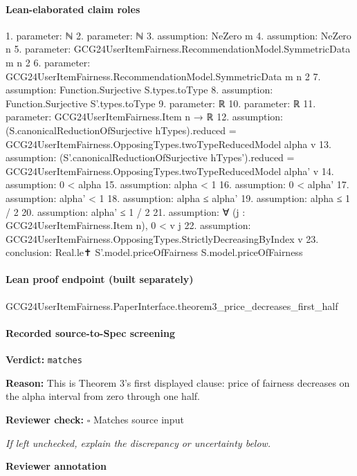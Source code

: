 \documentclass[10pt]{article}
\newcommand{\reviewerbox}{%
  \par\noindent\fbox{\parbox{0.96\linewidth}{\rule{0pt}{0.38in}}}\par
}
\newcommand{\reviewmatch}[1]{%
  \par\noindent\textbf{Reviewer check:} $\square$\; #1\par
  \noindent\emph{If left unchecked, explain the discrepancy or uncertainty below.}\par
}
\begin{document}
\paragraph{Lean-elaborated claim roles}\begin{ReviewVerbatim}
1. parameter: ℕ
2. parameter: ℕ
3. assumption: NeZero m
4. assumption: NeZero n
5. parameter: GCG24UserItemFairness.RecommendationModel.SymmetricData m n 2
6. parameter: GCG24UserItemFairness.RecommendationModel.SymmetricData m n 2
7. assumption: Function.Surjective S.types.toType
8. assumption: Function.Surjective S'.types.toType
9. parameter: ℝ
10. parameter: ℝ
11. parameter: GCG24UserItemFairness.Item n → ℝ
12. assumption: (S.canonicalReductionOfSurjective hTypes).reduced = GCG24UserItemFairness.OpposingTypes.twoTypeReducedModel alpha v
13. assumption: (S'.canonicalReductionOfSurjective hTypes').reduced = GCG24UserItemFairness.OpposingTypes.twoTypeReducedModel alpha' v
14. assumption: 0 < alpha
15. assumption: alpha < 1
16. assumption: 0 < alpha'
17. assumption: alpha' < 1
18. assumption: alpha ≤ alpha'
19. assumption: alpha ≤ 1 / 2
20. assumption: alpha' ≤ 1 / 2
21. assumption: ∀ (j : GCG24UserItemFairness.Item n), 0 < v j
22. assumption: GCG24UserItemFairness.OpposingTypes.StrictlyDecreasingByIndex v
23. conclusion: Real.le✝ S'.model.priceOfFairness S.model.priceOfFairness
\end{ReviewVerbatim}

\paragraph{Lean proof endpoint (built separately)}\begin{ReviewVerbatim}
GCG24UserItemFairness.PaperInterface.theorem3_price_decreases_first_half
\end{ReviewVerbatim}

\paragraph{Recorded source-to-Spec screening}
\textbf{Verdict:} \texttt{matches}
\\
{\raggedright
\textbf{Reason:} This is Theorem 3's first displayed clause:\allowbreak{} price of fairness decreases on the alpha interval from zero through one half.\allowbreak{}
\par}
\reviewmatch{Matches source input}
\noindent\textbf{Reviewer annotation}\par
\reviewerbox
\clearpage
\hypertarget{source-claim-9cd33ed0f79952fe}{}
\end{document}
